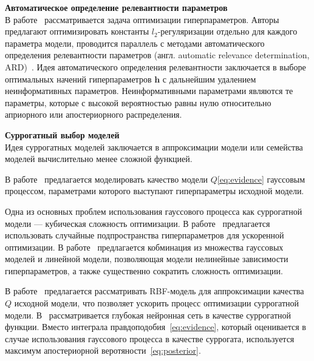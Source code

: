 \textbf{Автоматическое определение релевантности параметров}\\
В работе~\cite{hyper} рассматривается задача оптимизации гиперпараметров.  Авторы предлагают оптимизировать константы $l_2$-регуляризации отдельно для каждого параметра модели, проводится параллель с методами автоматического определения релевантности параметров (англ. automatic relevance determination, ARD)~\cite{MacKay}. 
Идея автоматического определения релевантности заключается в выборе оптимальных начений гиперпараметров $\mathbf{h}$ с дальнейшим удалением неинформативных параметров. Неинформативными параметрами являются те параметры, которые с высокой вероятностью равны нулю относительно априорного или апостериорного распределения.


\textbf{Суррогатный выбор моделей}\\
Идея суррогатных моделей заключается в аппроксимации модели или семейства моделей вычислительно менее сложной функцией.

В работе~\cite{bo_gp} предлагается моделировать качество модели $Q$\eqref{eq:evidence} гауссовым процессом, параметрами которого выступают гиперпараметры исходной модели.

Одна из основных проблем использования гауссового процесса как суррогатной модели --- кубическая сложность оптимизации. В работе~\cite{random_gaus} предлагается использовать случайные подпространства гиперпараметров для ускоренной оптимизации.  В работе~\cite{gp_tree} предлагается кобминация из множества гауссовых моделей и линейной модели, позволяющая модели нелинейные зависимости гиперпараметров, а также существенно сократить сложность оптимизации. 

В работе~\cite{rbf_surrogate} предлагается рассматривать RBF-модель для аппроксимации качества $Q$ исходной модели, что позволяет ускорить процесс оптимизации суррогатной модели. В~\cite{snoek_deep} рассматривается глубокая нейронная сеть в качестве суррогатной функции. Вместо интеграла правдоподобия~\eqref{eq:evidence}, который оценивается в случае использования гауссового процесса в качестве суррогата, используется максимум апостериорной веротяности~\eqref{eq:posterior}.

